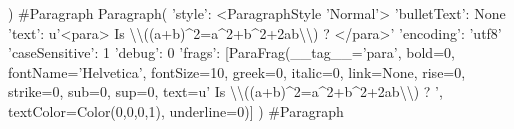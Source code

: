 \documentclass{article}%
\begin{document}
) \#Paragraph%
Paragraph(\newline%
'style': <ParagraphStyle 'Normal'>\newline%
'bulletText': None\newline%
'text': u'<para> Is \textbackslash{}\textbackslash{}((a+b)\^{}2=a\^{}2+b\^{}2+2ab\textbackslash{}\textbackslash{}) ? </para>'\newline%
'encoding': 'utf8'\newline%
'caseSensitive': 1\newline%
'debug': 0\newline%
'frags': {[}ParaFrag(\_\_tag\_\_='para', bold=0, fontName='Helvetica', fontSize=10, greek=0, italic=0, link=None, rise=0, strike=0, sub=0, sup=0, text=u' Is \textbackslash{}\textbackslash{}((a+b)\^{}2=a\^{}2+b\^{}2+2ab\textbackslash{}\textbackslash{}) ? ', textColor=Color(0,0,0,1), underline=0){]}\newline%
) \#Paragraph%
\end{document}
